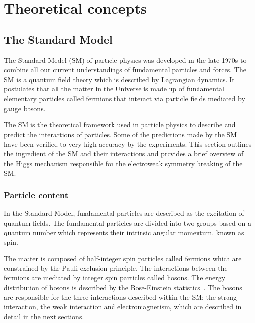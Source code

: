 


\chapter{Theoretical concepts}
\label{sec:theory}

\section{The Standard Model}%
\label{sec:theory:standardmodel}
The Standard Model (SM) of particle physics was developed in the late 1970s to combine all our current understandings of fundamental particles and forces. The SM is a quantum field theory which is described by Lagrangian dynamics. It postulates that all the matter in the Universe is made up of fundamental elementary particles called fermions that interact via particle fields mediated by gauge bosons.~\cite{thomson} 

The SM is the theoretical framework used in particle physics to describe and predict the interactions of particles. Some of the predictions made by the SM have been verified to very high accuracy by the experiments. This section outlines the ingredient of the SM and their interactions and provides a brief overview of the Higgs mechanism responsible for the electroweak symmetry breaking of the SM.

\subsection{Particle content}%
\label{sec:theory:standardmodel:particle}
In the Standard Model, fundamental particles are described as the excitation of quantum fields. The fundamental particles are divided into two groups based on a quantum number which represents their intrinsic angular momentum, known as spin. 

The matter is composed of half-integer spin particles called fermions which are constrained by the Pauli exclusion principle. The interactions between the fermions are mediated by integer spin particles called bosons. The energy distribution of bosons is described by the Bose-Einstein statistics~\cite{thomson}. The bosons are responsible for the three interactions described within the SM: the strong interaction, the weak interaction and electromagnetism, which are described in detail in the next sections. 

